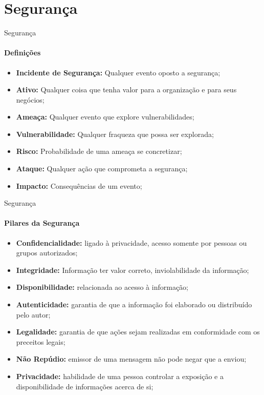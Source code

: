 \documentclass[aspectratio=169]{beamer}
\begin{document}
\section{Segurança}
\begin{frame}{Segurança}
    \framesubtitle{Definições}
    \begin{itemize}
        \item \textbf{Incidente de Segurança:} Qualquer evento oposto a segurança;
        \item \textbf{Ativo:} Qualquer coisa que tenha valor para a organização e para seus negócios;
        \item \textbf{Ameaça:} Qualquer evento que explore vulnerabilidades;
        \item \textbf{Vulnerabilidade:} Qualquer fraqueza que possa ser explorada;
        \item \textbf{Risco:} Probabilidade de uma ameaça se concretizar;
        \item \textbf{Ataque:} Qualquer ação que comprometa a segurança;
        \item \textbf{Impacto:} Consequências de um evento;
    \end{itemize}
\end{frame}
\begin{frame}{Segurança}
    \framesubtitle{Pilares da Segurança}
    \begin{itemize}
        \item \textbf{Confidencialidade:} ligado à privacidade, acesso somente por pessoas ou grupos autorizados;
        \item \textbf{Integridade:} Informação ter valor correto, inviolabilidade da informação;
        \item \textbf{Disponibilidade:} relacionada ao acesso à informação; 
        \item \textbf{Autenticidade:} garantia de que a informação foi elaborado ou distribuído pelo autor;
        \item \textbf{Legalidade:} garantia de que ações sejam realizadas em conformidade com os preceitos legais;
        \item \textbf{Não Repúdio:} emissor de uma mensagem não pode negar que a enviou;
        \item \textbf{Privacidade:} habilidade de uma pessoa controlar a exposição e a disponibilidade de informações acerca de si;
    \end{itemize}
\end{frame}
\end{document}
